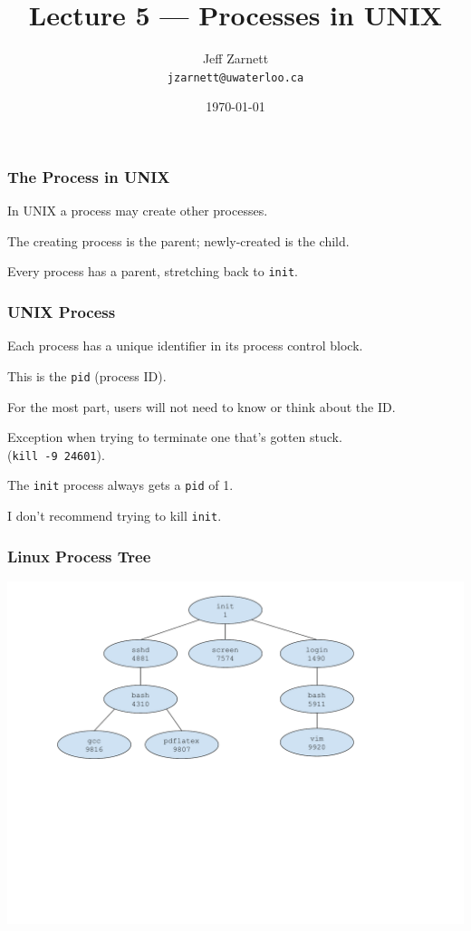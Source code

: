 

\title{Lecture 5 --- Processes in UNIX}

\author{Jeff Zarnett \\ \small \texttt{jzarnett@uwaterloo.ca}}
\date{\today}




\begin{frame}
  \titlepage

 \end{frame}

\begin{frame}
\frametitle{The Process in UNIX}

In UNIX a process may create other processes.

The creating process is the parent; newly-created is the child.

Every process has a parent, stretching back to \texttt{init}.

\end{frame}


\begin{frame}
\frametitle{UNIX Process}
Each process has a unique identifier in its process control block.

This is the \texttt{pid} (process ID). 

For the most part, users will not need to know or think about the ID.

Exception when trying to terminate one that's gotten stuck.\\
\quad (\texttt{kill -9 24601}). 

The \texttt{init} process always gets a \texttt{pid} of 1. 

I don't recommend trying to kill \texttt{init}.

\end{frame}

\begin{frame}
\frametitle{Linux Process Tree}

\begin{center}
\includegraphics[width=\textwidth]{images/linux-process-tree.pdf}
\end{center}

\end{frame}

